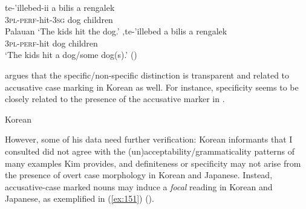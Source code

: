 \begin{exe}\ex\label{ex:149}
\begin{xlist}
    \ex \gll te-'illebed-ii     a bilis a rengalek    \\
    3\textsc{pl-perf}-hit-3\textsc{sg} {} dog  {}   children \\
    \hfill Palauan
    \glt ‘The kids hit the dog.’
    \ex ,\gll te-'illebed    a bilis a rengalek      \\
    3\textsc{pl-perf}-hit  {} dog  {}   children \\
    \glt ‘The kids hit a dog/some dog(s).’ (\citealt{Georgopoulos1991})
\end{xlist}
\end{exe}

\citet{Kim1993} argues that the specific/non-specific distinction is transparent and related to accusative case marking in Korean as well. For instance, specificity seems to be closely related to the presence of the accusative marker in .

\begin{exe}\ex\label{ex:150}
\begin{xlist}
    \hfill \hspace*{-5mm}Korean
\end{xlist}
\end{exe}

However, some of his data need further verification: Korean informants that I consulted did not agree with the (un)acceptability/grammaticality patterns of many examples Kim provides, and definiteness or specificity may not arise from the presence of overt case morphology in Korean and Japanese. Instead, accu\-sa\-tive-case marked nouns may induce a \textit{focal} reading in Korean and Japanese, as exemplified in (\ref{ex:151}) (\citealt{Jun2005,Ko2000,LeeH2006b,Matsuda1995}).

